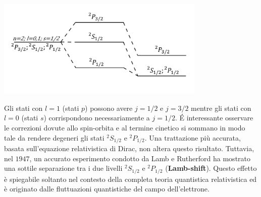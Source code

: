 \begin{center}
\includegraphics[width=10cm]{immagini/cap_25/fig25_1.png}
\end{center}
Gli stati con $l=1$ (stati $p$) possono avere $j=1/2$ e $j=3/2$ mentre gli stati con $l=0$ (stati $s$) corrispondono necessariamente a $j=1/2$. \'E interessante osservare le correzioni dovute allo spin-orbita e al termine cinetico si sommano in modo tale da rendere degeneri gli stati $^2S_{1/2}$ e $^2P_{1/2}$.
Una trattazione più accurata, basata sull'equazione relativistica di Dirac, non altera questo risultato. Tuttavia, nel $1947$, un accurato esperimento condotto da Lamb e Rutherford ha mostrato una sottile separazione tra i due livelli $^2S_{1/2}$ e $^2P_{1/2}$ (\textbf{Lamb-shift}). Questo effetto è spiegabile soltanto nel contesto della completa teoria quantistica relativistica ed è originato dalle fluttuazioni quantistiche del campo dell'elettrone.